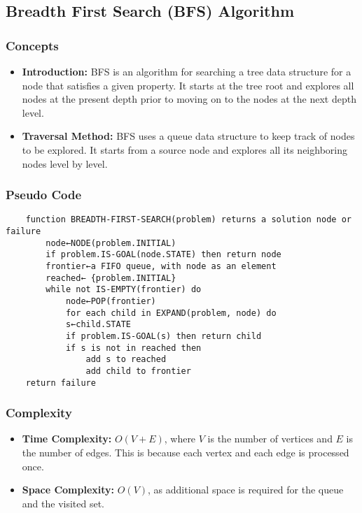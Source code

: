 \subsection{Breadth First Search (BFS) Algorithm }
\subsubsection*{Concepts}
\begin{itemize}
    \item \textbf{Introduction:} BFS is an algorithm for searching a tree data structure for a node that satisfies a given property. It starts at the tree root and explores all nodes at the present depth prior to moving on to the nodes at the next depth level.
    \item \textbf{Traversal Method:} BFS uses a queue data structure to keep track of nodes to be explored. It starts from a source node and explores all its neighboring nodes level by level.
\end{itemize}

\subsubsection*{Pseudo Code}
\begin{verbatim}
    function BREADTH-FIRST-SEARCH(problem) returns a solution node or failure
        node←NODE(problem.INITIAL)
        if problem.IS-GOAL(node.STATE) then return node
        frontier←a FIFO queue, with node as an element
        reached← {problem.INITIAL}
        while not IS-EMPTY(frontier) do
            node←POP(frontier)
            for each child in EXPAND(problem, node) do
            s←child.STATE
            if problem.IS-GOAL(s) then return child
            if s is not in reached then
                add s to reached
                add child to frontier
    return failure
\end{verbatim}

\subsubsection*{Complexity}
\begin{itemize}
    \item \textbf{Time Complexity:} \(O(V + E)\), where \(V\) is the number of vertices and \(E\) is the number of edges. This is because each vertex and each edge is processed once.
    \item \textbf{Space Complexity:} \(O(V)\), as additional space is required for the queue and the visited set.
\end{itemize}

